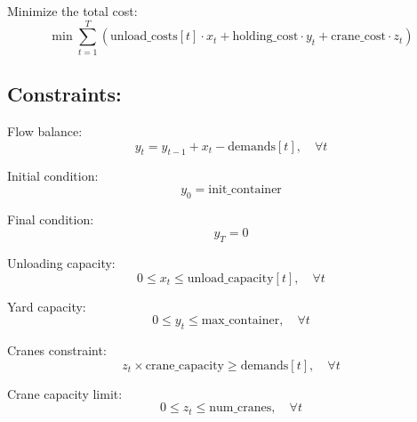 \documentclass{article}
\begin{document}
Minimize the total cost:
\[
\min \sum_{t=1}^{T} \left( \text{unload\_costs}[t] \cdot x_t + \text{holding\_cost} \cdot y_t + \text{crane\_cost} \cdot z_t \right)
\]

\subsection*{Constraints:}

Flow balance:
\[
y_t = y_{t-1} + x_t - \text{demands}[t], \quad \forall t
\]

Initial condition:
\[
y_0 = \text{init\_container}
\]

Final condition:
\[
y_T = 0
\]

Unloading capacity:
\[
0 \leq x_t \leq \text{unload\_capacity}[t], \quad \forall t
\]

Yard capacity:
\[
0 \leq y_t \leq \text{max\_container}, \quad \forall t
\]

Cranes constraint:
\[
z_t \times \text{crane\_capacity} \geq \text{demands}[t], \quad \forall t
\]

Crane capacity limit:
\[
0 \leq z_t \leq \text{num\_cranes}, \quad \forall t
\]
\end{document}
